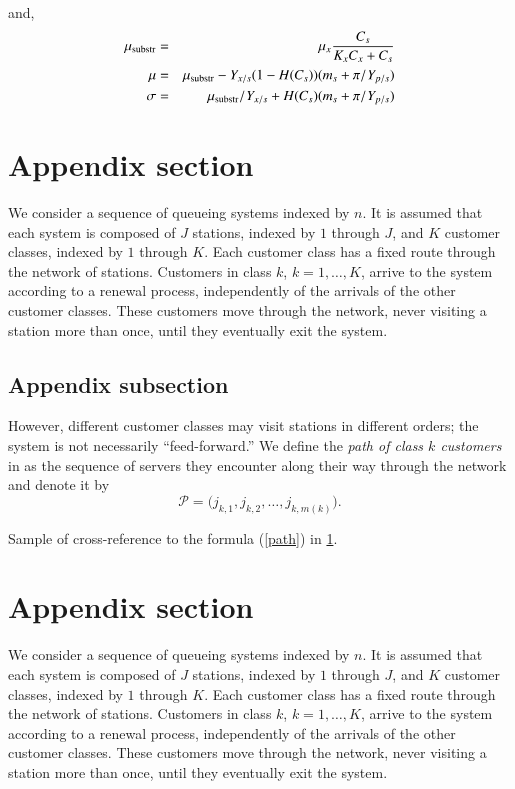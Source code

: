 \documentclass[fist]{svjour3}
\begin{document}
\noindent
and,
%
\begin{eqnarray}
 \mu_{\rm substr} & = & \mu_{x} \frac{C_{s}}{K_{x}C_{x}+C_{s}}  \\
 \mu              & = & \mu_{\rm substr} - Y_{x/s}(1-H(C_{s}))(m_{s}+\pi /Y_{p/s}) \\
 \sigma           & = & \mu_{\rm substr}/Y_{x/s}+ H(C_{s}) (m_{s}+ \pi /Y_{p/s})
\end{eqnarray}


\appendix

\section{Appendix section}\label{app}

We consider a sequence of queueing systems
indexed by $n$.  It is assumed that each system
is composed of $J$ stations, indexed by $1$
through $J$, and $K$ customer classes, indexed
by $1$ through $K$.  Each customer class
has a fixed route through the network of
stations.  Customers in class
$k$, $k=1,\ldots,K$, arrive to the
system according to a
renewal process, independently of the arrivals
of the other customer classes.  These customers
move through the network, never visiting a station
more than once, until they eventually exit
the system.

\subsection*{Appendix subsection}

However, different customer classes may visit
stations in different orders; the system
is not necessarily ``feed-forward.''
We define the {\em path of class $k$ customers} in
as the sequence of servers
they encounter along their way through the network
and denote it by
\begin{equation}
\mathcal{P}=\bigl(j_{k,1},j_{k,2},\dots,j_{k,m(k)}\bigr). \label{path}
\end{equation}

Sample of cross-reference to the formula (\ref{path}) in  \ref{app}.

\section{Appendix section}\label{appB}

We consider a sequence of queueing systems
indexed by $n$.  It is assumed that each system
is composed of $J$ stations, indexed by $1$
through $J$, and $K$ customer classes, indexed
by $1$ through $K$.  Each customer class
has a fixed route through the network of
stations.  Customers in class
$k$, $k=1,\ldots,K$, arrive to the
system according to a
renewal process, independently of the arrivals
of the other customer classes.  These customers
move through the network, never visiting a station
more than once, until they eventually exit
the system.
\end{document}
